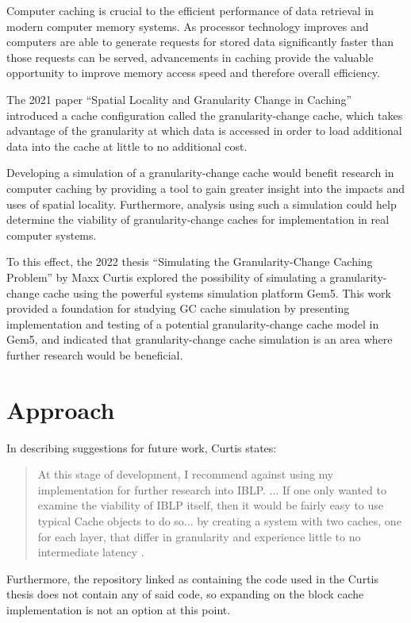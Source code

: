 \documentclass[12pt,twoside]{reedthesis}
\begin{document}
Computer caching is crucial to the efficient performance of data retrieval in modern computer memory systems. As processor technology improves and computers are able to generate requests for stored data significantly faster than those requests can be served, advancements in caching provide the valuable opportunity to improve memory access speed and therefore overall efficiency.

The 2021 paper ``Spatial Locality and Granularity Change in Caching'' introduced a cache configuration called the granularity-change cache, which takes advantage of the granularity at which data is accessed in order to load additional data into the cache at little to no additional cost.

Developing a simulation of a granularity-change cache would benefit research in computer caching by providing a tool to gain greater insight into the impacts and uses of spatial locality. Furthermore, analysis using such a simulation could help determine the viability of granularity-change caches for implementation in real computer systems.

To this effect, the 2022 thesis ``Simulating the Granularity-Change Caching Problem'' by Maxx Curtis explored the possibility of simulating a granularity-change cache using the powerful systems simulation platform Gem5. This work provided a foundation for studying GC cache simulation by presenting implementation and testing of a potential granularity-change cache model in Gem5, and indicated that granularity-change cache simulation is an area where further research would be beneficial.

\section{Approach}

	In describing suggestions for future work, Curtis states: \begin{quote}
		At this stage of development, I recommend against using my implementation for further research into IBLP. ... If one only wanted to examine the viability of IBLP itself, then it would be fairly easy to use typical Cache objects to do so... by creating a system with two caches, one for each layer, that differ in granularity and experience little to no intermediate latency \cite{curtis}.
	\end{quote}

	Furthermore, the repository linked as containing the code used in the Curtis thesis does not contain any of said code, so expanding on the block cache implementation is not an option at this point.
\end{document}

